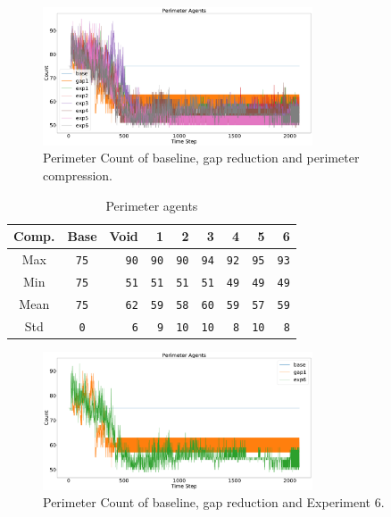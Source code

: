 \documentclass[12pt,a4paper]{IEEEtran}
\begin{document}
\begin{figure}[H]
	\begin{center}
		\includegraphics[width=8cm]{figures/PerimeterCount}
	\end{center}
	\caption{Perimeter Count of baseline, gap reduction and perimeter compression. \label{fig:perimeterCount}}
\end{figure}

\begin{table}[h]
	\centering
	\tiny
	\begin{tabular}{|c|c|r|r|r|r|r|r|r|}
		\hline
		\rowcolor[HTML]{000000} 
		{\color[HTML]{FFFFFF} Comp.} &{\color[HTML]{FFFFFF} Base} & {\color[HTML]{FFFFFF} Void} & {\color[HTML]{FFFFFF} 1} & {\color[HTML]{FFFFFF} 2} & {\color[HTML]{FFFFFF} 3} & {\color[HTML]{FFFFFF} 4} & {\color[HTML]{FFFFFF} 5} & {\color[HTML]{FFFFFF} 6}\\ \hline
		Max & \texttt{75} & \texttt{90} &\texttt{90} & \texttt{90} & \texttt{94} & \texttt{92} & \texttt{95} & \texttt{93} \\ \hline
		Min & \texttt{75} & \texttt{51} &\texttt{51}  & \texttt{51} & \texttt{51} & \texttt{49} & \texttt{49} & \texttt{49}\\ \hline
		Mean & \texttt{75} & \texttt{62} &\texttt{59}  & \texttt{58} & \texttt{60} & \texttt{59} & \texttt{57} & \texttt{59}\\ \hline
		Std & \texttt{0} & \texttt{6} &\texttt{9}  & \texttt{10} & \texttt{10} & \texttt{8} & \texttt{10} & \texttt{8}\\ \hline
	\end{tabular}
	\caption{Perimeter agents}
	\label{tab:perimeterLimits}
\end{table}

\begin{figure}[H]
	\begin{center}
		\includegraphics[width=8cm]{figures/PerimeterCount2}
	\end{center}
	\caption{Perimeter Count of baseline, gap reduction and Experiment 6. \label{fig:perimeterCount2}}
\end{figure}
\end{document}
